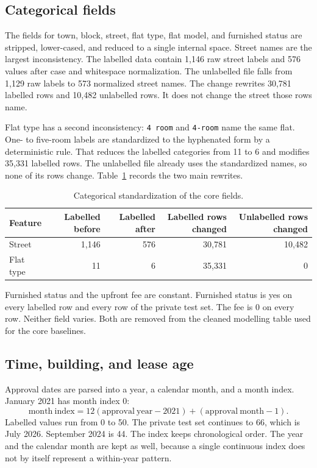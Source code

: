 \documentclass[11pt,a4paper]{article}
\begin{document}
\subsection{Categorical fields}

The fields for town, block, street, flat type, flat model, and furnished status are stripped, lower-cased, and reduced to a single internal space.
Street names are the largest inconsistency.
The labelled data contain 1{,}146 raw street labels and 576 values after case and whitespace normalization.
The unlabelled file falls from 1{,}129 raw labels to 573 normalized street names.
The change rewrites 30{,}781 labelled rows and 10{,}482 unlabelled rows.
It does not change the street those rows name.

Flat type has a second inconsistency: \texttt{4 room} and \texttt{4-room} name the same flat.
One- to five-room labels are standardized to the hyphenated form by a deterministic rule.
That reduces the labelled categories from 11 to 6 and modifies 35{,}331 labelled rows.
The unlabelled file already uses the standardized names, so none of its rows change.
Table~\ref{tab:category-cleaning} records the two main rewrites.

\begin{table}[htbp]
\centering
\caption{Categorical standardization of the core fields.}
\label{tab:category-cleaning}
\small
\begin{tabular}{lrrrr}
\toprule
Feature & Labelled before & Labelled after & Labelled rows changed & Unlabelled rows changed \\
\midrule
Street & 1{,}146 & 576 & 30{,}781 & 10{,}482 \\
Flat type & 11 & 6 & 35{,}331 & 0 \\
\bottomrule
\end{tabular}
\end{table}

Furnished status and the upfront fee are constant.
Furnished status is yes on every labelled row and every row of the private test set.
The fee is 0 on every row.
Neither field varies.
Both are removed from the cleaned modelling table used for the core baselines.

\subsection{Time, building, and lease age}

Approval dates are parsed into a year, a calendar month, and a month index.
January 2021 has month index 0:
\begin{equation}
\label{eq:month-index}
\mathrm{month\ index}
=
12(\mathrm{approval\ year}-2021)
+
(\mathrm{approval\ month}-1).
\end{equation}
Labelled values run from 0 to 50.
The private test set continues to 66, which is July 2026.
September 2024 is 44.
The index keeps chronological order.
The year and the calendar month are kept as well, because a single continuous index does not by itself represent a within-year pattern.
\end{document}
